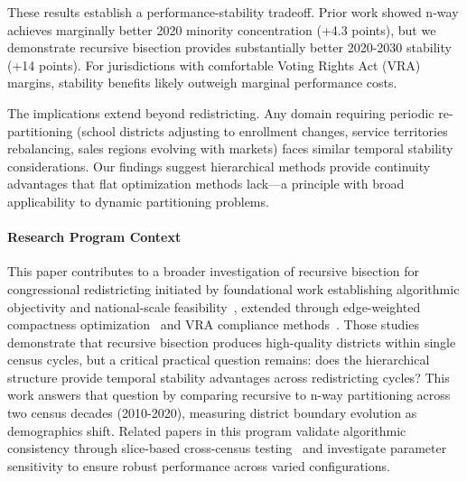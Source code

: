 These results establish a performance-stability tradeoff. Prior work showed n-way achieves marginally better 2020 minority concentration (+4.3 points), but we demonstrate recursive bisection provides substantially better 2020-2030 stability (+14 points). For jurisdictions with comfortable Voting Rights Act (VRA) margins, stability benefits likely outweigh marginal performance costs.

The implications extend beyond redistricting. Any domain requiring periodic re-partitioning (school districts adjusting to enrollment changes, service territories rebalancing, sales regions evolving with markets) faces similar temporal stability considerations. Our findings suggest hierarchical methods provide continuity advantages that flat optimization methods lack—a principle with broad applicability to dynamic partitioning problems.

\paragraph{Research Program Context} This paper contributes to a broader investigation of recursive bisection for congressional redistricting initiated by foundational work establishing algorithmic objectivity and national-scale feasibility~\cite{della-libera-recursive-bisection}, extended through edge-weighted compactness optimization~\cite{della-libera-edge-weighted} and VRA compliance methods~\cite{della-libera-vra-compliance}. Those studies demonstrate that recursive bisection produces high-quality districts within single census cycles, but a critical practical question remains: does the hierarchical structure provide temporal stability advantages across redistricting cycles? This work answers that question by comparing recursive to n-way partitioning across two census decades (2010-2020), measuring district boundary evolution as demographics shift. Related papers in this program validate algorithmic consistency through slice-based cross-census testing~\cite{della-libera-cross-census-validation} and investigate parameter sensitivity to ensure robust performance across varied configurations.
